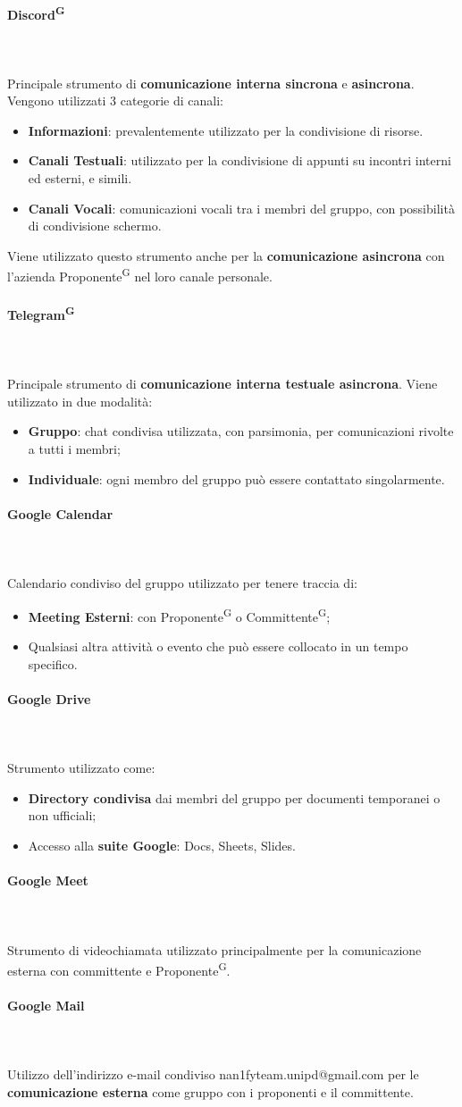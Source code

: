 \documentclass[8pt]{article}
\newcommand{\glossterm}[1]{#1\textsuperscript{G}} %
\newcommand{\subsubsubsection}[1]{\paragraph{#1}\mbox{}\\}
\begin{document}
\subsubsubsection{\glossterm{Discord}}\\
Principale strumento di \textbf{comunicazione interna sincrona} e \textbf{asincrona}. Vengono utilizzati 3 categorie di canali:
\begin{itemize}
  \item \textbf{Informazioni}: prevalentemente utilizzato per la condivisione di risorse.
  \item \textbf{Canali Testuali}: utilizzato per la condivisione di appunti su incontri interni ed esterni, e simili.
  \item \textbf{Canali Vocali}: comunicazioni vocali tra i membri del gruppo, con possibilità di condivisione schermo.
\end{itemize}
\medskip
Viene utilizzato questo strumento anche per la \textbf{comunicazione asincrona} con l'azienda
\glossterm{Proponente} nel loro canale personale.
\subsubsubsection{\glossterm{Telegram}}\\
Principale strumento di \textbf{comunicazione interna testuale asincrona}. Viene utilizzato in due modalità:
\begin{itemize}
  \item \textbf{Gruppo}: chat condivisa utilizzata, con parsimonia, per comunicazioni rivolte a tutti i membri;
  \item \textbf{Individuale}: ogni membro del gruppo può essere contattato singolarmente.
\end{itemize}
\medskip
\subsubsubsection{Google Calendar}\\
Calendario condiviso del gruppo utilizzato per tenere traccia di:
\begin{itemize}
    \item \textbf{Meeting Esterni}: con \glossterm{Proponente} o \glossterm{Committente};
  \item Qualsiasi altra attività o evento che può essere collocato in un tempo specifico.
\end{itemize}
\subsubsubsection{Google Drive}\\
Strumento utilizzato come:
\begin{itemize}
  \item \textbf{Directory condivisa} dai membri del gruppo per documenti temporanei o non ufficiali;
  \item Accesso alla \textbf{suite Google}: Docs, Sheets, Slides.
\end{itemize}
\subsubsubsection{Google Meet}\\
Strumento di videochiamata utilizzato principalmente per la comunicazione esterna con committente e
\glossterm{Proponente}.
\subsubsubsection{Google Mail}\\
Utilizzo dell'indirizzo e-mail condiviso nan1fyteam.unipd@gmail.com per le \textbf{comunicazione esterna} come gruppo con i proponenti e il committente.
\end{document}
